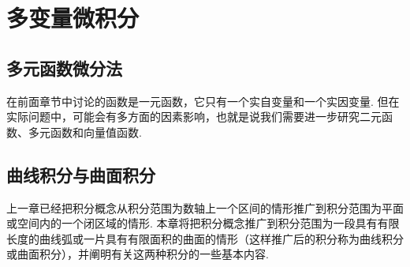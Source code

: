 \part{多变量微积分}
\chapter{多元函数微分法}
在前面章节中讨论的函数是一元函数，它只有一个实自变量和一个实因变量.
但在实际问题中，可能会有多方面的因素影响，也就是说我们需要进一步研究二元函数、多元函数和向量值函数.

















\chapter{曲线积分与曲面积分}
上一章已经把积分概念从积分范围为数轴上一个区间的情形推广到积分范围为平面或空间内的一个闭区域的情形.
本章将把积分概念推广到积分范围为一段具有有限长度的曲线弧或一片具有有限面积的曲面的情形（这样推广后的积分称为曲线积分或曲面积分），并阐明有关这两种积分的一些基本内容.











